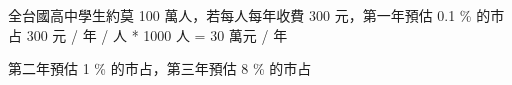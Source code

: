 
全台國高中學生約莫 100 萬人，若每人每年收費 300 元，第一年預估 0.1 \% 的市占
300 元 / 年 / 人 * 1000 人 = 30 萬元 / 年

第二年預估 1 \% 的市占，第三年預估 8 \% 的市占

